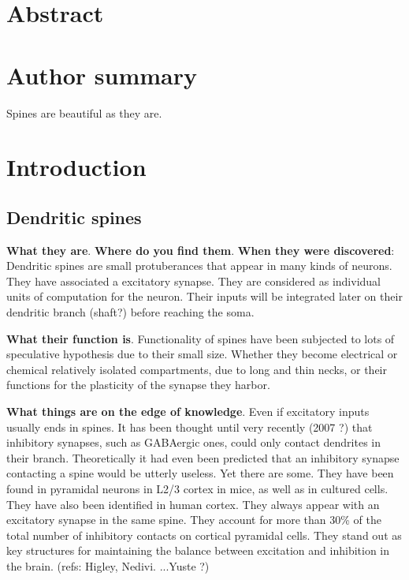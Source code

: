 \documentclass[10pt,letterpaper]{article}
\begin{document}
\section*{Abstract}



\section*{Author summary}
Spines are beautiful as they are.

\section*{Introduction}


\subsection*{\bf Dendritic spines} {\bf What they are}. {\bf Where do you find them}. {\bf When they were discovered}:
Dendritic spines are small protuberances that appear in many kinds of neurons. They have associated a excitatory synapse. They are considered as individual units of computation for the neuron. Their inputs will be integrated later on their dendritic branch (shaft?) before reaching the soma. 

{\bf What their function is}. Functionality of spines have been subjected to lots of speculative hypothesis due to their small size. Whether they become electrical or chemical relatively isolated compartments, due to long and thin necks, or their functions for the plasticity of the synapse they harbor. 

{\bf What things are on the edge of knowledge}. Even if excitatory inputs usually ends in spines. It has been thought until very recently (2007 ?) that inhibitory synapses, such as GABAergic ones, could only contact dendrites in their branch. Theoretically it had even been predicted that an inhibitory synapse contacting a spine would be utterly useless. Yet there are some.  They have been found in pyramidal neurons in L2/3 cortex in mice, as well as in cultured cells. They have also been identified in human cortex. They always appear with an excitatory synapse in the same spine. They account for more than 30\% of the total number of inhibitory contacts on cortical pyramidal cells. They stand out as key structures for maintaining the balance between excitation and inhibition in the brain. (refs: Higley, Nedivi. ...Yuste ?)
\end{document}
